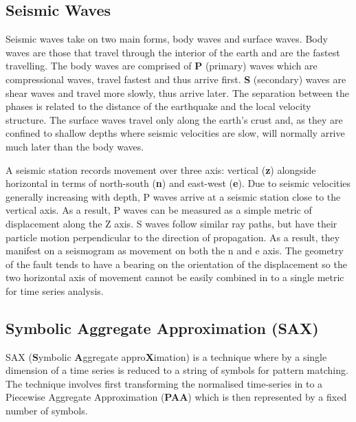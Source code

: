\documentclass[11pt, a4paper]{scrartcl}
\begin{document}
\subsection{Seismic Waves}
\label{sec:seismicwaves}
	Seismic waves take on two main forms, body waves and surface waves.  Body waves are those that travel through the interior of the earth and are the fastest travelling.  The body waves are comprised of \textbf{P} (primary) waves which are compressional waves, travel fastest and thus arrive first.  \textbf{S} (secondary) waves are shear waves and travel more slowly, thus arrive later.  The separation between the phases is related to the distance of the earthquake and the local velocity structure. The surface waves travel only along the earth’s crust and, as they are confined to shallow depths where seismic velocities are slow, will normally arrive much later than the body waves.
	
	A seismic station records movement over three axis: vertical (\textbf{z}) alongside horizontal in terms of north-south (\textbf{n}) and east-west (\textbf{e}).  Due to seismic velocities generally increasing with depth, P waves arrive at a seismic station close to the vertical axis.  As a result, P waves can be measured as a simple metric of displacement along the Z axis.  S waves follow similar ray paths, but have their particle motion perpendicular to the direction of propagation.  As a result, they manifest on a seismogram as movement on both the n and e axis. The geometry of the fault tends to have a bearing on the orientation of the displacement so the two horizontal axis of movement cannot be easily combined in to a single metric for time series analysis.
	
\subsection{Symbolic Aggregate Approximation (SAX)}
	SAX (\textbf{S}ymbolic \textbf{A}ggregate appro\textbf{X}imation) \citep{sax} is a technique where by a single dimension of a time series is reduced to a string of symbols for pattern matching.  The technique involves first transforming the normalised time-series in to a Piecewise Aggregate Approximation (\textbf{PAA}) which is then represented by a fixed number of symbols.
	
\end{document}
